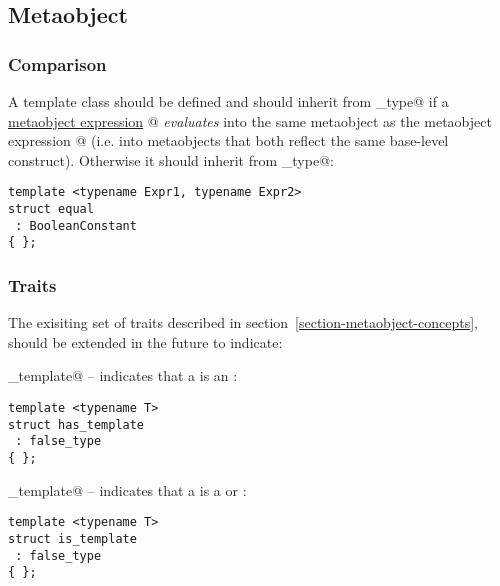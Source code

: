 \subsection{Metaobject}
\label{concept-Metaobject}


\subsubsection{Comparison}

A template class \verb@equal@ should be defined and should inherit from \verb@true_type@
if a \hyperref[section-Library]{metaobject expression} @ {\em evaluates} into
the same metaobject as the metaobject expression @ (i.e. into metaobjects
that both reflect the same base-level construct). Otherwise it should inherit from
\verb@false_type@:

\begin{verbatim}
template <typename Expr1, typename Expr2>
struct equal
 : BooleanConstant
{ };
\end{verbatim}

\subsubsection{Traits}

The exisiting set of traits described in section~\ref{section-metaobject-concepts},
should be extended in the future to indicate:

\verb@has_template@ -- indicates that a  is an :
\begin{verbatim}
template <typename T>
struct has_template
 : false_type
{ };
\end{verbatim}

\verb@is_template@ -- indicates that a  is a 
or :
\begin{verbatim}
template <typename T>
struct is_template
 : false_type
{ };
\end{verbatim}

